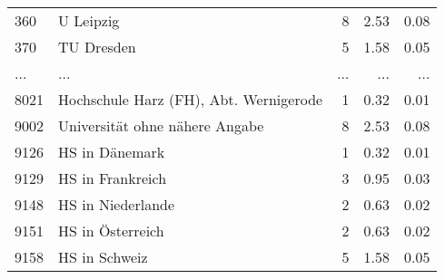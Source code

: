 \begin{longtable}{lXrrr}
        360 & \multicolumn{1}{X}{U Leipzig} & %
          \num{8} &
          \num[round-mode=places,round-precision=2]{2.53} &
          \num[round-mode=places,round-precision=2]{0.08} \\
        370 & \multicolumn{1}{X}{TU Dresden} & %
          \num{5} &
          \num[round-mode=places,round-precision=2]{1.58} &
          \num[round-mode=places,round-precision=2]{0.05} \\
       ... & ... & ... & ... & ... \\
        8021 & \multicolumn{1}{X}{Hochschule Harz (FH), Abt. Wernigerode} & %
          \num{1} &
          \num[round-mode=places,round-precision=2]{0.32} &
          \num[round-mode=places,round-precision=2]{0.01} \\

        9002 & \multicolumn{1}{X}{Universität ohne nähere Angabe} & %
          \num{8} &
          \num[round-mode=places,round-precision=2]{2.53} &
          \num[round-mode=places,round-precision=2]{0.08} \\

        9126 & \multicolumn{1}{X}{HS in Dänemark} & %
          \num{1} &
          \num[round-mode=places,round-precision=2]{0.32} &
          \num[round-mode=places,round-precision=2]{0.01} \\

        9129 & \multicolumn{1}{X}{HS in Frankreich} & %
          \num{3} &
          \num[round-mode=places,round-precision=2]{0.95} &
          \num[round-mode=places,round-precision=2]{0.03} \\

        9148 & \multicolumn{1}{X}{HS in Niederlande} & %
          \num{2} &
          \num[round-mode=places,round-precision=2]{0.63} &
          \num[round-mode=places,round-precision=2]{0.02} \\

        9151 & \multicolumn{1}{X}{HS in Österreich} & %
          \num{2} &
          \num[round-mode=places,round-precision=2]{0.63} &
          \num[round-mode=places,round-precision=2]{0.02} \\

        9158 & \multicolumn{1}{X}{HS in Schweiz} & %
          \num{5} &
          \num[round-mode=places,round-precision=2]{1.58} &
          \num[round-mode=places,round-precision=2]{0.05} \\


\end{longtable}
